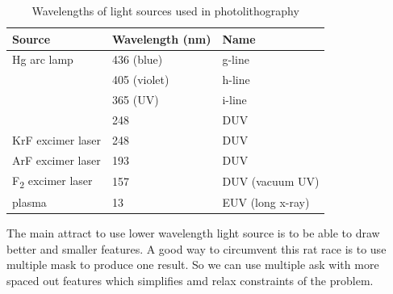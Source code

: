 \documentclass{report}
\begin{document}
\begin{table}[hbt]
\centering
\begin{tabular}{l l l}
\textbf{Source} & \textbf{Wavelength (nm)} & \textbf{Name} \\
\hline
Hg arc lamp     & 436 (blue)               & g-line         \\
                & 405 (violet)             & h-line         \\
                & 365 (UV)                 & i-line         \\
                & 248                      & DUV            \\
KrF excimer laser & 248                   & DUV            \\
ArF excimer laser & 193                   & DUV            \\
F\textsubscript{2} excimer laser & 157     & DUV (vacuum UV)\\
plasma          & 13                       & EUV (long x-ray) \\
\end{tabular}
\caption{Wavelengths of light sources used in photolithography}
\end{table}

The main attract to use lower wavelength light source is to be able to draw better and smaller features. A good way to circumvent this rat race is to use multiple mask to produce one result. So we can use multiple ask with more spaced out features which simplifies amd relax constraints of the problem.
\end{document}
